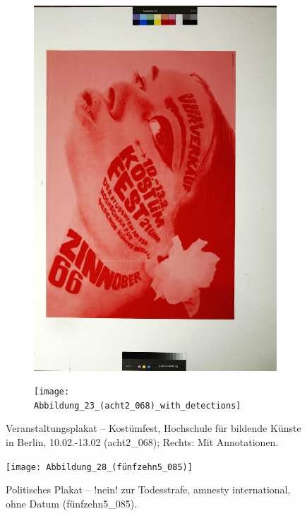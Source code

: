 \documentclass[a4paper,12pt,ngerman]{article}
\begin{document}
\newpage
\begin{landscape}
\begin{figure}[ht]
	\begin{subfigure}[b]{0.5\linewidth}
	\centering
	\includegraphics[height=\linewidth]{Abbildung_27_(acht2_068)}
	\end{subfigure}
	\begin{subfigure}[b]{0.5\linewidth}
	\centering
	\texttt{[image: Abbildung\_23\_(acht2\_068)\_with\_detections]}
	\end{subfigure}
	\caption{Veranstaltungsplakat – Kostümfest, Hochschule für bildende Künste in Berlin, 10.02.-13.02 (acht2\_068); Rechts: Mit Annotationen.}
\end{figure}
\end{landscape}

\newpage
\begin{figure}[ht]
\texttt{[image: Abbildung\_28\_(fünfzehn5\_085)]}
\centering
\caption{Politisches Plakat – !nein! zur Todesstrafe, amnesty international, ohne Datum (fünfzehn5\_085).}
\end{figure}
\end{document}
